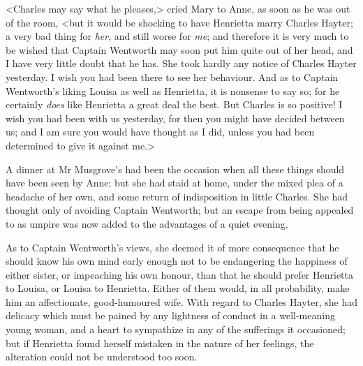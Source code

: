 <Charles may say what he pleases,> cried Mary to Anne, as soon as he was out of the room, <but it would be shocking to have Henrietta marry Charles Hayter; a very bad thing for \textit{her}, and still worse for \textit{me}; and therefore it is very much to be wished that Captain Wentworth may soon put him quite out of her head, and I have very little doubt that he has. She took hardly any notice of Charles Hayter yesterday. I wish you had been there to see her behaviour. And as to Captain Wentworth's liking Louisa as well as Henrietta, it is nonsense to say so; for he certainly \textit{does} like Henrietta a great deal the best. But Charles is so positive! I wish you had been with us yesterday, for then you might have decided between us; and I am sure you would have thought as I did, unless you had been determined to give it against me.>

A dinner at Mr Musgrove's had been the occasion when all these things should have been seen by Anne; but she had staid at home, under the mixed plea of a headache of her own, and some return of indisposition in little Charles. She had thought only of avoiding Captain Wentworth; but an escape from being appealed to as umpire was now added to the advantages of a quiet evening.

As to Captain Wentworth's views, she deemed it of more consequence that he should know his own mind early enough not to be endangering the happiness of either sister, or impeaching his own honour, than that he should prefer Henrietta to Louisa, or Louisa to Henrietta. Either of them would, in all probability, make him an affectionate, good-humoured wife. With regard to Charles Hayter, she had delicacy which must be pained by any lightness of conduct in a well-meaning young woman, and a heart to sympathize in any of the sufferings it occasioned; but if Henrietta found herself mistaken in the nature of her feelings, the alteration could not be understood too soon.

